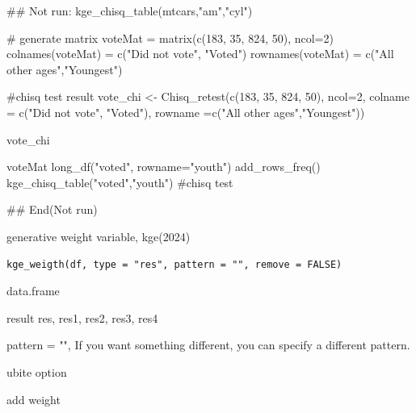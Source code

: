 \documentclass[a4paper]{book}
\begin{document}
%
\begin{Examples}
\begin{ExampleCode}

\#\# Not run: 
kge_chisq_table(mtcars,"am","cyl")

# generate matrix
voteMat = matrix(c(183, 35, 824, 50), ncol=2)
colnames(voteMat) = c("Did not vote", "Voted")
rownames(voteMat) = c("All other ages","Youngest")

#chisq test result
vote_chi <- Chisq_retest(c(183, 35, 824, 50), ncol=2,
                        colname = c("Did not vote", "Voted"),
                         rowname =c("All other ages","Youngest"))

vote_chi

voteMat%
  long_df("voted", rowname="youth")%
  add_rows_freq() %
  kge_chisq_table("voted","youth")    #chisq test


## End(Not run)
\end{ExampleCode}
\end{Examples}
%
\begin{Description}
generative weight variable, kge(2024)
\end{Description}
%
\begin{Usage}
\begin{verbatim}
kge_weigth(df, type = "res", pattern = "", remove = FALSE)
\end{verbatim}
\end{Usage}
%
\begin{Arguments}
\begin{ldescription}
\item[\code{df}] data.frame

\item[\code{type}] result res, res1, res2, res3, res4

\item[\code{pattern}] pattern = "", If you want something different, you can specify a different pattern.

\item[\code{remove}] ubite option
\end{ldescription}
\end{Arguments}
%
\begin{Value}
add weight
\end{Value}
%
\end{document}
